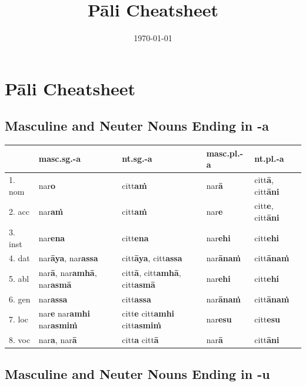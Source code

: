 \documentclass[a4paper]{memoir}
\date{\today}
\title{Pāli Cheatsheet}
\begin{document}
\chapter{Pāli Cheatsheet}
\label{sec:orgd057acd}
\section{Masculine and Neuter Nouns Ending in -a}
\label{sec:org00f233c}

\begin{center}
\begin{tabular}{lllll}
 & \textbf{masc.sg.-a} & \textbf{nt.sg.-a} & \textbf{masc.pl.-a} & \textbf{nt.pl.-a}\\[0pt]
\hline
1. nom & nar\textbf{o} & citt\textbf{aṁ} & nar\textbf{ā} & citt\textbf{ā}, citt\textbf{āni}\\[0pt]
2. acc & nar\textbf{aṁ} & citt\textbf{aṁ} & nar\textbf{e} & citt\textbf{e}, citt\textbf{āni}\\[0pt]
3. inst & nar\textbf{ena} & citt\textbf{ena} & nar\textbf{ehi} & citt\textbf{ehi}\\[0pt]
4. dat & nar\textbf{āya}, nar\textbf{assa} & citt\textbf{āya}, citt\textbf{assa} & nar\textbf{ānaṁ} & citt\textbf{ānaṁ}\\[0pt]
5. abl & nar\textbf{ā}, nar\textbf{amhā}, nar\textbf{asmā} & citt\textbf{ā}, citt\textbf{amhā}, citt\textbf{asmā} & nar\textbf{ehi} & citt\textbf{ehi}\\[0pt]
6. gen & nar\textbf{assa} & citt\textbf{assa} & nar\textbf{ānaṁ} & citt\textbf{ānaṁ}\\[0pt]
7. loc & nar\textbf{e} nar\textbf{amhi} nar\textbf{asmiṁ} & citt\textbf{e} citt\textbf{amhi} citt\textbf{asmiṁ} & nar\textbf{esu} & citt\textbf{esu}\\[0pt]
8. voc & nar\textbf{a}, nar\textbf{ā} & citt\textbf{a} citt\textbf{ā} & nar\textbf{ā} & citt\textbf{āni}\\[0pt]
\end{tabular}
\end{center}

\section{Masculine and Neuter Nouns Ending in -u}
\label{sec:org3c7ff26}
\end{document}
